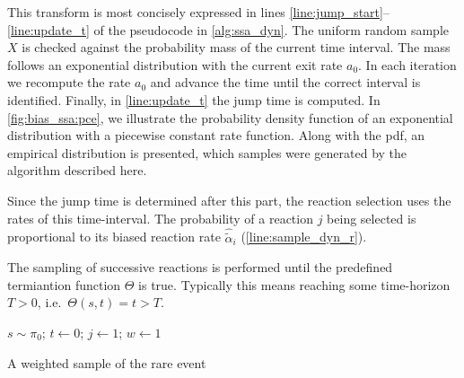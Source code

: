 This transform is most concisely expressed in lines \ref{line:jump_start}--\ref{line:update_t} of the pseudocode in \autoref{alg:ssa_dyn}.
The uniform random sample $X$ is checked against the probability mass of the current time interval.
The mass follows an exponential distribution with the current exit rate $a_0$.
In each iteration we recompute the rate $a_0$ and advance the time until the correct interval is identified.
Finally, in \autoref{line:update_t} the jump time is computed.
In \autoref{fig:bias_ssa:pce}, we illustrate the probability density function of an exponential distribution with a piecewise constant rate function.
Along with the pdf, an empirical distribution is presented, which samples were generated by the algorithm described here.

Since the jump time is determined after this part, the reaction selection uses the rates of this time-interval.
The probability of a reaction $j$ being selected is proportional to its biased reaction rate $\hat{\tilde{\alpha}}_{i}$ (\autoref{line:sample_dyn_r}).

The sampling of successive reactions is performed until the predefined termiantion function $\Theta$ is true.
Typically this means reaching some time-horizon $T>0$, i.e.\ $\Theta(s, t)=t>T$.
\begin{algorithm}
    $s\sim\pi_0$; $t\leftarrow 0$; $j\leftarrow 1$; $w\leftarrow 1$\;
    \caption{\label{alg:ssa_dyn}A weighted sample of the rare event}
\end{algorithm}

